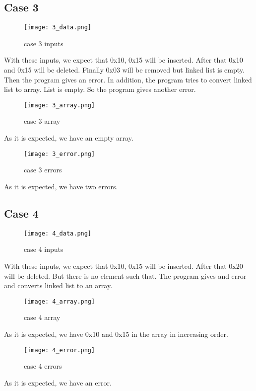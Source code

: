 \documentclass[pdftex,12pt,a4paper]{article}
\begin{document}
\subsection{Case 3}
\begin{figure}[H]
	\centering
	\texttt{[image: 3\_data.png]}
	\caption{case 3 inputs}
	\label{}
\end{figure}
With these inputs, we expect that 0x10, 0x15 will be inserted. After that 0x10 and 0x15 will be deleted. Finally 0x03 will be removed but linked list is empty. Then the program gives an error. In addition, the program tries to convert linked list to array. List is empty. So the program gives another error.
\begin{figure}[H]
	\centering
	\texttt{[image: 3\_array.png]}
	\caption{case 3 array}
	\label{}
\end{figure}
As it is expected, we have an empty array.
\begin{figure}[H]
	\centering
	\texttt{[image: 3\_error.png]}
	\caption{case 3 errors}
	\label{}
\end{figure}
As it is expected, we have two errors.

\subsection{Case 4}
\begin{figure}[H]
	\centering
	\texttt{[image: 4\_data.png]}
	\caption{case 4 inputs}
	\label{}
\end{figure}
With these inputs, we expect that 0x10, 0x15 will be inserted. After that 0x20 will be deleted. But there is no element such that. The program gives and error and converts linked list to an array.
\begin{figure}[H]
	\centering
	\texttt{[image: 4\_array.png]}
	\caption{case 4 array}
	\label{}
\end{figure}
As it is expected, we have 0x10 and 0x15 in the array in increasing order.
\begin{figure}[H]
	\centering
	\texttt{[image: 4\_error.png]}
	\caption{case 4 errors}
	\label{}
\end{figure}
As it is expected, we have an error.
\end{document}
